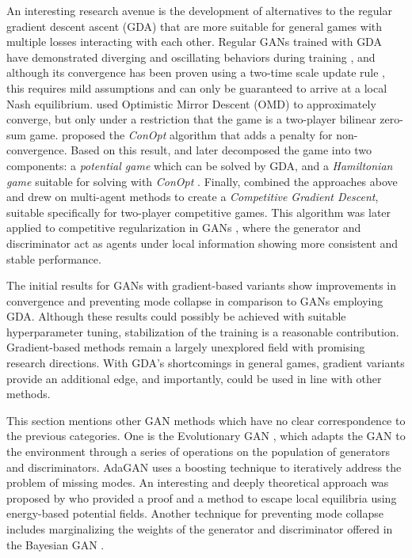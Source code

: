 An interesting research avenue is the development of alternatives to the regular gradient descent ascent (GDA) that are more suitable for general games with multiple losses interacting with each other. Regular GANs trained with GDA have demonstrated diverging and oscillating behaviors during training , and although its convergence has been proven using a two-time scale update rule , this requires mild assumptions and can only be guaranteed to arrive at a local Nash equilibrium.   used Optimistic Mirror Descent (OMD) to approximately converge, but only under a restriction that the game is a two-player bilinear zero-sum game.  proposed the \textit{ConOpt} algorithm that adds a penalty for non-convergence. Based on this result,  and later  decomposed the game into two components: a \textit{potential game} which can be solved by GDA, and a \textit{Hamiltonian game} suitable for solving with \textit{ConOpt} . Finally,  combined the approaches above and drew on multi-agent methods  to create a \textit{Competitive Gradient Descent}, suitable specifically for two-player competitive games. This algorithm was later applied to competitive regularization in GANs , where the generator and discriminator act as agents under local information showing more consistent and stable performance.

The initial results for GANs with gradient-based variants show improvements in convergence and preventing mode collapse in comparison to GANs employing GDA. Although these results could possibly be achieved with suitable hyperparameter tuning, stabilization of the training is a reasonable contribution. Gradient-based methods remain a largely unexplored field with promising research directions. With GDA's shortcomings in general games, gradient variants provide an additional edge, and importantly, could be used in line with other methods.

This section mentions other GAN methods which have no clear correspondence to the previous categories. One is the Evolutionary GAN , which adapts the GAN to the environment through a series of operations on the population of generators and discriminators. AdaGAN  uses a boosting technique to iteratively address the problem of missing modes. An interesting and deeply theoretical approach was proposed by  who provided a proof and a method to escape local equilibria using energy-based potential fields. Another technique for preventing mode collapse includes marginalizing the weights of the generator and discriminator offered in the Bayesian GAN .

